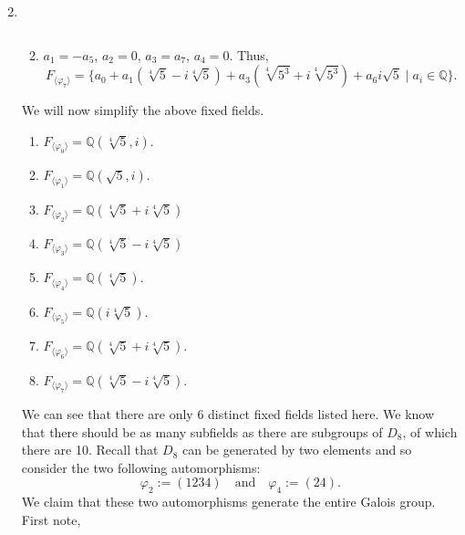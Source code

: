 \documentclass[12pt]{article}
\makeatletter
\theoremstyle{definition}
\theoremstyle{remark}
\newenvironment{solution}[1][\bf{\textit{Solution}}]{\par
  
  \normalfont \topsep6\p@\@plus6\p@\relax
  \list{}{\leftmargin=0mm
          \rightmargin=4mm
          \settowidth{\itemindent}{\itshape#1}%
          \labelwidth=\itemindent
          \parsep=0pt \listparindent=\parindent 
  }
  \item[\hskip\labelsep
        \itshape
    #1\@addpunct{.}]\ignorespaces
}{%
  \popQED\endlist\@endpefalse
}
\makeatother
\begin{document}
\begin{enumerate}[leftmargin=*]
\begin{solution}
\begin{enumerate}[label=\arabic*.]
\begin{equation*}
                            \end{equation*}
                        \item $a_1=-a_5$, $a_2=0$, $a_3=a_7$, $a_4=0$. Thus,
                            \begin{equation*}
                                F_{\langle\varphi_7\rangle}=\{a_0+a_1(\sqrt[4]{5}-i\sqrt[4]{5})+a_3(\sqrt[4]{5^3}+i\sqrt[4]{5^3})+a_6i\sqrt{5}\mid a_i\in\mathbb{Q}\}.
                            \end{equation*}
                    \end{enumerate}\newpage
                We will now simplify the above fixed fields. 
                    \begin{enumerate}[label=\arabic*.]
                        \item $F_{\langle\varphi_0\rangle}=\mathbb{Q}(\sqrt[4]{5},i)$.
                        \item $F_{\langle\varphi_1\rangle}=\mathbb{Q}(\sqrt{5},i)$.
                        \item $F_{\langle\varphi_2\rangle}=\mathbb{Q}(\sqrt[4]{5}+i\sqrt[4]{5})$
                        \item $F_{\langle\varphi_3\rangle}=\mathbb{Q}(\sqrt[4]{5}-i\sqrt[4]{5})$
                        \item $F_{\langle\varphi_4\rangle}=\mathbb{Q}(\sqrt[4]{5})$.
                        \item $F_{\langle\varphi_5\rangle}=\mathbb{Q}(i\sqrt[4]{5})$.
                        \item $F_{\langle\varphi_6\rangle}=\mathbb{Q}(\sqrt[4]{5}+i\sqrt[4]{5})$.
                        \item $F_{\langle\varphi_7\rangle}=\mathbb{Q}(\sqrt[4]{5}-i\sqrt[4]{5})$.
                    \end{enumerate}
                We can see that there are only 6 distinct fixed fields listed here. We know that there should be as many subfields as there are subgroups of $D_8$, of which there are 10. Recall that $D_8$ can be generated by two elements and so consider the two following automorphisms:
                    \begin{equation*}
                        \varphi_2:=(1234)\quad\text{and}\quad\varphi_4:=(24).
                    \end{equation*}
                We claim that these two automorphisms generate the entire Galois group. First note,
                    \begin{equation*}

\end{equation*}
\end{solution}
\end{enumerate}
\end{document}
